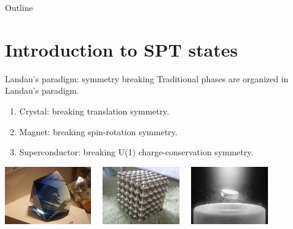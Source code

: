 \documentclass[xcolor=table, aspectratio=169,ignorenonframetext]{beamer}
\begin{document}
\begin{frame}{Outline}
		\tableofcontents
\end{frame}

\section{Introduction to SPT states}

\begin{frame}{Landau's paradigm: symmetry breaking}
  Traditional phases are organized in Landau's paradigm.
  \begin{enumerate}
  \item Crystal: breaking translation symmetry.
  \item Magnet: breaking spin-rotation symmetry.
  \item Superconductor: breaking U(1) charge-conservation symmetry.
  \end{enumerate}
  \begin{center}
    \includegraphics[height=2.5cm]{../resources/crystal}~~
    \includegraphics[height=2.5cm]{../resources/magnet}~~
    \includegraphics[height=2.5cm]{../resources/sc}
  \end{center}
\end{frame}
\end{document}
